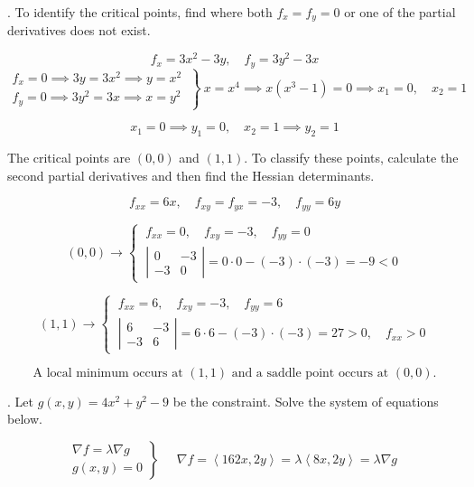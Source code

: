 \documentclass{article}
\begin{document}
\hfill

. To identify the critical points, find where both $f_x=f_y=0$ or one of the partial derivatives does not exist.

\[f_x=3x^2-3y,\quad f_y=3y^2-3x\]
\[\left.\begin{array}{c}
f_x=0\implies 3y=3x^2\implies y=x^2\\
f_y=0\implies 3y^2=3x\implies x=y^2 
\end{array}\:\right\}\: x=x^4\implies x(x^3-1)=0\implies x_1=0,\quad x_2=1\]

\[x_1=0\implies y_1=0,\quad x_2=1\implies y_2=1\]

\hfill

\noindent The critical points are $(0,0)$ and $(1,1)$. To classify these points, calculate the second partial derivatives and then find the Hessian determinants.

\[f_{xx}=6x,\quad f_{xy}=f_{yx}=-3,\quad f_{yy}=6y\]

\[(0,0)\rightarrow\left\{\:\begin{array}{l}
f_{xx}=0,\quad f_{xy}=-3,\quad f_{yy}=0\\[1em]
\left|\begin{array}{cc}
0 & -3\\
-3 & 0
\end{array}\right|=0\cdot0-(-3)\cdot(-3)=-9<0
\end{array}\right.\]

\[(1,1)\rightarrow\left\{\:\begin{array}{l}
f_{xx}=6,\quad f_{xy}=-3,\quad f_{yy}=6\\[1em]
\left|\begin{array}{cc}
6 & -3\\
-3 & 6
\end{array}\right|=6\cdot6-(-3)\cdot (-3)=27>0,\quad f_{xx}>0
\end{array}\right.\]

\[\boxed{\text{A local minimum occurs at }(1,1)\text{ and a saddle point occurs at }(0,0).}\]

\newpage

. Let $g(x,y)=4x^2+y^2-9$ be the constraint. Solve the system of equations below.

\[
\left.
\begin{array}{c}
\displaystyle\nabla f=\lambda\nabla g\\
\displaystyle g(x,y)=0
\end{array}
\right\}\quad
\begin{array}{l}
\nabla f=\left\langle162x,2y\right\rangle=\lambda\left\langle8x,2y\right\rangle=\lambda\nabla g
\end{array}
\]
\end{document}
